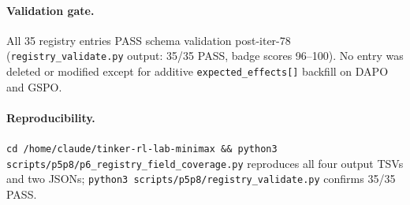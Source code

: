 \paragraph{Validation gate.}
All 35 registry entries PASS schema validation post-iter-78
(\texttt{registry\_validate.py} output: 35/35 PASS, badge scores
96--100). No entry was deleted or modified except for additive
\texttt{expected\_effects[]} backfill on DAPO and GSPO.

\paragraph{Reproducibility.}
\texttt{cd /home/claude/tinker-rl-lab-minimax \&\& python3
scripts/p5p8/p6\_registry\_field\_coverage.py} reproduces all four
output TSVs and two JSONs; \texttt{python3 scripts/p5p8/registry\_validate.py}
confirms 35/35 PASS.